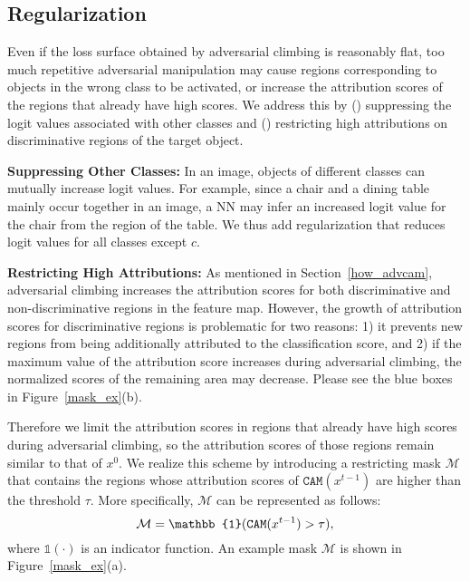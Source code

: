 \documentclass[final]{cvpr}
\begin{document}
\newcommand{\RNum}[1]{\lowercase\expandafter{\romannumeral #1\relax}}


\subsection{Regularization}\label{reg_sec}
Even if the loss surface obtained by adversarial climbing is reasonably flat, too much repetitive adversarial manipulation may cause regions corresponding to objects in the wrong class to be activated, or increase the attribution scores of the regions that already have high scores.
We address this by (\RNum{1}) suppressing the logit values associated with other classes and (\RNum{2}) restricting high attributions on discriminative regions of the target object.

\textbf{Suppressing Other Classes:}
In an image, objects of different classes can mutually increase logit values.
For example, since a chair and a dining table mainly occur together in an image, a NN may infer an increased logit value for the chair from the region of the table.
We thus add regularization that reduces logit values for all classes except $c$.

\textbf{Restricting High Attributions:}
As mentioned in Section~\ref{how_advcam}, adversarial climbing increases the attribution scores for both discriminative and non-discriminative regions in the feature map.
However, the growth of attribution scores for discriminative regions is problematic for two reasons: 1) it prevents new regions from being additionally attributed to the classification score, and 2) if the maximum value of the attribution score increases during adversarial climbing, the normalized scores of the remaining area may decrease. Please see the blue boxes in Figure~\ref{mask_ex}(b).


Therefore we limit the attribution scores in regions that already have high scores during adversarial climbing, so the attribution scores of those regions remain similar to that of $x^{0}$.
We realize this scheme by introducing a restricting mask $\mathcal{M}$ that contains the regions whose attribution scores of $\texttt{CAM}(x^{t-1})$ are higher than the threshold $\tau$. 
More specifically, $\mathcal{M}$ can be represented as follows:
\vspace{-0.1em}
\begin{equation}\label{mask}
\mathcal{M} = \mathbb{1}(\texttt{CAM}(x^{t-1}) > \tau),
\vspace{-0.1em}
\end{equation}
where $\mathbb{1}(\mathord{\cdot})$ is an indicator function. An example mask $\mathcal{M}$ is shown in Figure~\ref{mask_ex}(a). 
\end{document}

